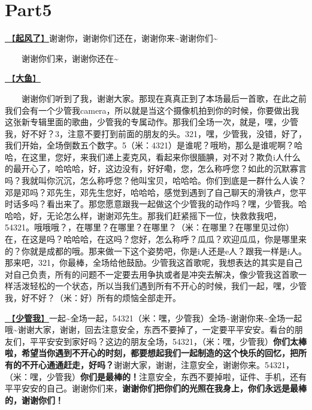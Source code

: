 \documentclass[]{ctexbook}
\begin{document}
\section{Part5}\label{chengdu-20240615-part5}

\hyperref[the-wind-rises]{🎵【\textbf{起风了}】}谢谢你，谢谢你们还在，谢谢你来\textasciitilde 谢谢你们\textasciitilde{}

  谢谢你们来，谢谢你还在\textasciitilde{}

\hyperref[big-fish]{🎵【\textbf{大鱼}】}

  谢谢你们听到了我，谢谢大家。那现在真真正到了本场最后一首歌，在此之前我们会有一个少管我camera，所以就是当这个摄像机拍到你的时候，你要做出我这张新专辑里面的歌曲，少管我的专属动作。那我们全场一次，就是，嘿，少管我，好不好？3，注意不要打到前面的朋友的头。321，嘿，少管我，没错，好了，我们开始，全场倒数五个数字。5（米：4321）是谁呢？哦哟，那么是谁呢啊？哈哈，在这里，您好，来我们递上麦克风，看起来你很腼腆，对不对？欺负i人什么的最开心了，哈哈哈，好，这边没有，好好嘞，您，怎么称呼您？如此的沉默寡言吗？我就叫你沉沉，怎么称呼您？他叫宝贝，哈哈哈。你们到底是一群什么人诶？邓是邓吗？邓先生，邓先生您好，哈哈哈，感觉到遇到了自己聊天的滑铁卢，您平时话多吗？看出来了。那您愿意跟我一起做这个少管我的动作吗？嘿，少管我。哈哈哈，好，无论怎么样，谢谢邓先生。那我们赶紧摇下一位，快救救我吧，54321。哦哦哦？，在哪里？在哪里？在哪里？（米：在哪里？在哪里见过你）在，在这是吗？哈哈哈，在这吗？您好，怎么称呼？瓜瓜？欢迎瓜瓜，你是哪里来的？你就是成都的哦。那来做一下这个姿势吧，你是i人还是e人？跟我一样是i人。那来吧，321，你最棒，全场给他鼓励。少管我这首歌呢，我想表达的其实是自己对自己负责，所有的问题不一定要去用争执或者是冲突去解决，像少管我这首歌一样活泼轻松的一个状态，所以当我们遇到所有不开心的时候，我们一起，嘿，少管我，好不好？（米：好）所有的烦恼全部走开。

\hyperref[watch-ur-manners]{🎵【\textbf{少管我}】}一起\textasciitilde 全场一起，54321（米：嘿，少管我）全场\textasciitilde 谢谢你来\textasciitilde 全场一起哦\textasciitilde 谢谢大家，谢谢，回去注意安全，东西不要掉了，一定要平平安安。看台的朋友们，平平安安到家好吗？这边的朋友全场，54321，（米：嘿，少管我）\textbf{你们太棒啦，希望当你遇到不开心的时刻，都要想起我们一起制造的这个快乐的回忆，把所有的不开心通通赶走，好吗？}谢谢大家，谢谢，注意安全，谢谢你来。54321，（米：嘿，少管我）\textbf{你们是最棒的！}注意安全，东西不要掉啦，证件、手机，还有平平安安的自己。谢谢你们来，\textbf{谢谢你们把你们的光照在我身上，你们永远是最棒的，谢谢你们！}
\end{document}
